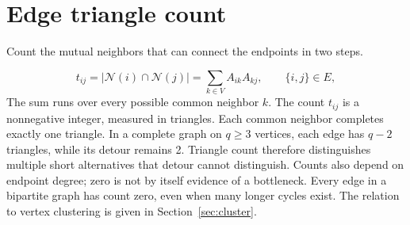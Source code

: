 \documentclass[11pt]{article}
\newcommand{\N}{\mathcal N}
\newcommand{\plain}[1]{\noindent #1\par\smallskip}
\begin{document}
\section{Edge triangle count}
\plain{Count the mutual neighbors that can connect the endpoints in two steps.}
\begin{equation}
 t_{ij}=|\N(i)\cap\N(j)|=\sum_{k\in V} A_{ik}A_{kj},\qquad \{i,j\}\in E,
\end{equation}
The sum runs over every possible common neighbor $k$. The count $t_{ij}$ is a nonnegative integer, measured in triangles. Each common neighbor completes exactly one triangle. In a complete graph on $q\geq3$ vertices, each edge has $q-2$ triangles, while its detour remains 2. Triangle count therefore distinguishes multiple short alternatives that detour cannot distinguish. Counts also depend on endpoint degree; zero is not by itself evidence of a bottleneck. Every edge in a bipartite graph has count zero, even when many longer cycles exist. The relation to vertex clustering is given in Section~\ref{sec:cluster}.

\clearpage
\end{document}
